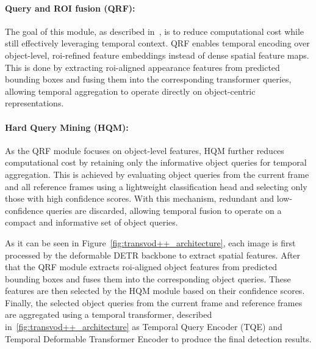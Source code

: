 \documentclass[final,twoside]{vutinfth}
\begin{document}
\paragraph{Query and ROI fusion (QRF):}
The goal of this module, as described in~\cite{zhou2023transvodpp}, is to reduce computational cost while still effectively leveraging temporal context.
QRF enables temporal encoding over object-level, \gls{roi}-refined feature embeddings instead of dense spatial feature maps. 
This is done by extracting \gls{roi}-aligned appearance features from predicted bounding boxes and fusing them into the corresponding transformer queries, allowing temporal aggregation to operate directly on object-centric representations.

\paragraph{Hard Query Mining (HQM):}
As the QRF module focuses on object-level features, HQM further reduces computational cost by retaining only the informative object queries for temporal aggregation.
This is achieved by evaluating object queries from the current frame and all reference frames using a lightweight classification head and selecting only those with high confidence scores.
With this mechanism, redundant and low-confidence queries are discarded, allowing temporal fusion to operate on a compact and informative set of object queries.

As it can be seen in Figure~\ref{fig:transvod++_architecture}, each image is first processed by the deformable DETR backbone to extract spatial features.
After that the QRF module extracts \gls{roi}-aligned object features from predicted bounding boxes and fuses them into the corresponding object queries.
These features are then selected by the HQM module based on their confidence scores.
Finally, the selected object queries from the current frame and reference frames are aggregated using a temporal transformer, described in~\ref{fig:transvod++_architecture} as Temporal Query Encoder (TQE) and Temporal
Deformable Transformer Encoder to produce the final detection results.
\end{document}

